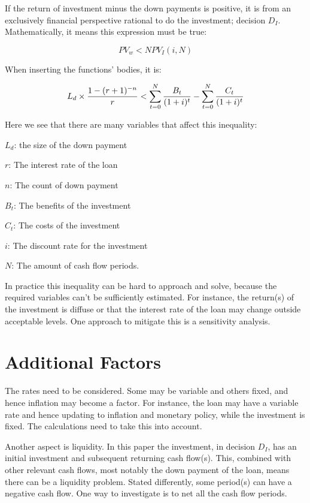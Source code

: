 \documentclass[a4paper]{article}
\begin{document}
If the return of investment minus the down payments is positive, it is from an
exclusively financial perspective rational to do the investment; decision $D_I$.
Mathematically, it means this expression must be true:

\begin{equation}
    PV_w < NPV_I(i, N)
\end{equation}

When inserting the functions' bodies, it is:

\begin{equation}
    \PV_w < \NPV_I
\end{equation}

Here we see that there are many variables that affect this inequality:

$L_d$: the size of the down payment

$r$: The interest rate of the loan

$n$: The count of down payment

$B_t$: The benefits of the investment

$C_t$: The costs of the investment

$i$: The discount rate for the investment

$N$: The amount of cash flow periods.

In practice this inequality can be hard to approach and solve, because the
required variables can't be sufficiently estimated. For instance, the return(s)
of the investment is diffuse or that the interest rate of the loan may change
outside acceptable levels. One approach to mitigate this is a sensitivity
analysis.

\section{Additional Factors}

The rates need to be considered. Some may be variable and others fixed, and
hence inflation may become a factor. For instance, the loan may have a variable
rate and hence updating to inflation and monetary policy, while the investment
is fixed. The calculations need to take this into account.

Another aspect is liquidity. In this paper the investment, in decision $D_I$,
has an initial investment and subsequent returning cash flow(s). This, combined
with other relevant cash flows, most notably the down payment of the loan, means
there can be a liquidity problem. Stated differently, some period(s) can have a
negative cash flow. One way to investigate is to net all the cash flow periods.
\end{document}
